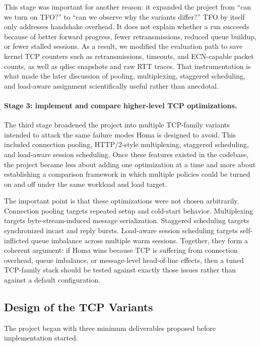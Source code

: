 \documentclass[11pt]{article}
\begin{document}
This stage was important for another reason: it expanded the project from ``can we turn on TFO?'' to ``can we observe why the variants differ?'' TFO by itself only addresses handshake overhead. It does not explain whether a run succeeds because of better forward progress, fewer retransmissions, reduced queue buildup, or fewer stalled sessions. As a result, we modified the evaluation path to save kernel TCP counters such as retransmissions, timeouts, and ECN-capable packet counts, as well as qdisc snapshots and raw RTT traces. That instrumentation is what made the later discussion of pooling, multiplexing, staggered scheduling, and load-aware assignment scientifically useful rather than anecdotal.

\paragraph{Stage 3: implement and compare higher-level TCP optimizations.}
The third stage broadened the project into multiple TCP-family variants intended to attack the same failure modes Homa is designed to avoid. This included connection pooling, HTTP/2-style multiplexing, staggered scheduling, and load-aware session scheduling. Once these features existed in the codebase, the project became less about adding one optimization at a time and more about establishing a comparison framework in which multiple policies could be turned on and off under the same workload and load target.

The important point is that these optimizations were not chosen arbitrarily. Connection pooling targets repeated setup and cold-start behavior. Multiplexing targets byte-stream-induced message serialization. Staggered scheduling targets synchronized incast and reply bursts. Load-aware session scheduling targets self-inflicted queue imbalance across multiple warm sessions. Together, they form a coherent argument: if Homa wins because TCP is suffering from connection overhead, queue imbalance, or message-level head-of-line effects, then a tuned TCP-family stack should be tested against exactly those issues rather than against a default configuration.

\subsection{Design of the TCP Variants}

The project began with three minimum deliverables proposed before implementation started.
\end{document}
